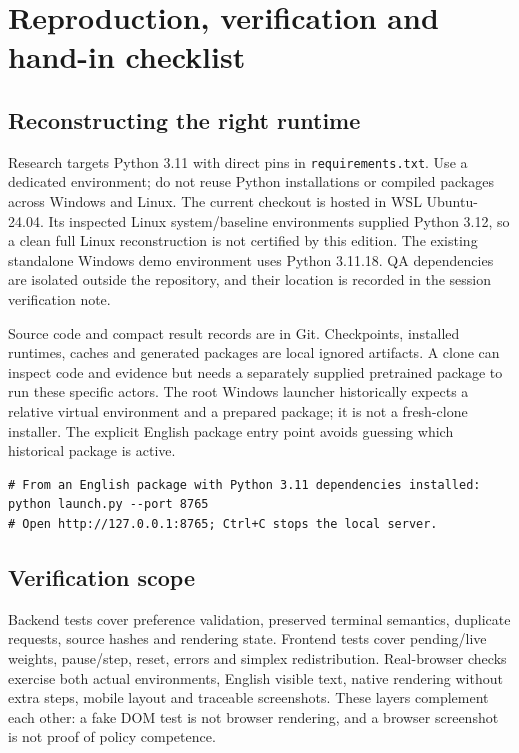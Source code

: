 \section{Reproduction, verification and hand-in checklist}
\subsection{Reconstructing the right runtime}
Research targets Python 3.11 with direct pins in \texttt{requirements.txt}.
Use a dedicated environment; do not reuse Python installations or compiled
packages across Windows and Linux. The current checkout is hosted in WSL
Ubuntu-24.04. Its inspected Linux system/baseline environments supplied Python
3.12, so a clean full Linux reconstruction is not certified by this edition.
The existing standalone Windows demo environment uses Python 3.11.18.
QA dependencies are isolated outside the repository, and their location is
recorded in the session verification note.

Source code and compact result records are in Git. Checkpoints, installed
runtimes, caches and generated packages are local ignored artifacts. A clone
can inspect code and evidence but needs a separately supplied pretrained
package to run these specific actors. The root Windows launcher historically
expects a relative virtual environment and a prepared package; it is not a
fresh-clone installer. The explicit English package entry point avoids guessing
which historical package is active.

\begin{verbatim}
# From an English package with Python 3.11 dependencies installed:
python launch.py --port 8765
# Open http://127.0.0.1:8765; Ctrl+C stops the local server.
\end{verbatim}

\subsection{Verification scope}
Backend tests cover preference validation, preserved terminal semantics,
duplicate requests, source hashes and rendering state. Frontend tests cover
pending/live weights, pause/step, reset, errors and simplex redistribution.
Real-browser checks exercise both actual environments, English visible text,
native rendering without extra steps, mobile layout and traceable screenshots.
These layers complement each other: a fake DOM test is not browser rendering,
and a browser screenshot is not proof of policy competence.

